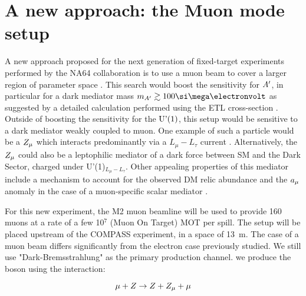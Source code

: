 \FloatBarrier\noindent
\section{A new approach: the Muon mode setup}
\label{ch5:sec:muon-mode-setup}

A new approach proposed for the next generation of fixed-target experiments performed by the NA64 collaboration is to use a muon beam to cover a larger region of parameter space \cite{Gninenko:2019qiv}. This search would boost the sensitivity for $A'$, in particular for a dark mediator mass $m_{\DM} \gtrsim 100 \mev$ as suggested by a detailed calculation performed using the ETL cross-section \cite{Gninenko:2019qiv}. Outside of boosting the sensitivity for the $\textrm{U'(1)}$, this setup would be sensitive to a dark mediator weakly coupled to muon. One example of such a particle would be a $Z_{\mu}$ which interacts predominantly via a $L_{\mu} - L_{\tau}$ current \cite{krasnikov2017muon,GNINENKO2001119}. Alternatively, the $Z_{\mu}$ could also be a leptophilic mediator of a dark force between SM and the Dark Sector, charged under U'(1)$_{L_{\mu} - L_{\tau}}$. Other appealing properties of this mediator include a mechanism to account for the observed DM relic abundance \cite{GNINENKO2001119,Kirpichnikov:2020tcf,PhysRevLett.121.011102} and the $a_{\mu}$ anomaly in the case of a muon-specific scalar mediator \cite{krasnikov2017light,PhysRevD.95.115005}.

For this new experiment, the M2 muon beamline will be used to provide 160 \gev muons at a rate of a few 10$^7$ (Muon On Target) MOT per spill. The setup will be placed upstream of the COMPASS experiment, in a space of \SI{13}{\meter}. The case of a muon beam differs significantly from the electron case previously studied. We still use "Dark-Bremsstrahlung" as the primary production channel. we produce the boson using the interaction:

\begin{equation}
  \label{eq:dm-muon-int}
  \mu + Z \to Z + Z_{\mu} + \mu
\end{equation}


